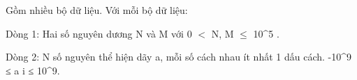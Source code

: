 Gồm nhiều bộ dữ liệu. Với mỗi bộ dữ liệu:

Dòng 1: Hai số nguyên dương N và M với 0 $<$ N, M  $\le$  10^5 .

Dòng 2: N số nguyên thể hiện dãy a, mỗi số cách nhau ít nhất 1 dấu cách. -10^9 ≤ a i ≤ 10^9.

\